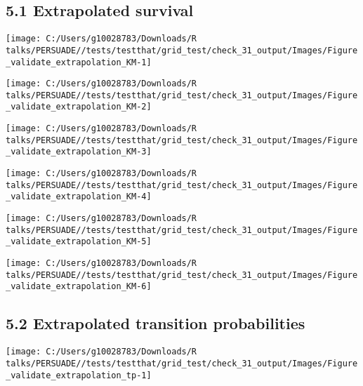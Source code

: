 \documentclass[
]{article}
\begin{document}
\subsection{5.1 Extrapolated survival}\label{extrapolated-survival}

\begin{flushleft}\texttt{[image: C:/Users/g10028783/Downloads/R talks/PERSUADE//tests/testthat/grid\_test/check\_31\_output/Images/Figure\_validate\_extrapolation\_KM-1]} \end{flushleft}

\begin{flushleft}\texttt{[image: C:/Users/g10028783/Downloads/R talks/PERSUADE//tests/testthat/grid\_test/check\_31\_output/Images/Figure\_validate\_extrapolation\_KM-2]} \end{flushleft}

\begin{flushleft}\texttt{[image: C:/Users/g10028783/Downloads/R talks/PERSUADE//tests/testthat/grid\_test/check\_31\_output/Images/Figure\_validate\_extrapolation\_KM-3]} \end{flushleft}

\begin{flushleft}\texttt{[image: C:/Users/g10028783/Downloads/R talks/PERSUADE//tests/testthat/grid\_test/check\_31\_output/Images/Figure\_validate\_extrapolation\_KM-4]} \end{flushleft}

\begin{flushleft}\texttt{[image: C:/Users/g10028783/Downloads/R talks/PERSUADE//tests/testthat/grid\_test/check\_31\_output/Images/Figure\_validate\_extrapolation\_KM-5]} \end{flushleft}

\begin{flushleft}\texttt{[image: C:/Users/g10028783/Downloads/R talks/PERSUADE//tests/testthat/grid\_test/check\_31\_output/Images/Figure\_validate\_extrapolation\_KM-6]} \end{flushleft}

\clearpage

\subsection{5.2 Extrapolated transition
probabilities}\label{extrapolated-transition-probabilities}

\begin{flushleft}\texttt{[image: C:/Users/g10028783/Downloads/R talks/PERSUADE//tests/testthat/grid\_test/check\_31\_output/Images/Figure\_validate\_extrapolation\_tp-1]} \end{flushleft}
\end{document}

